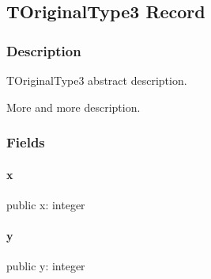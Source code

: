 \documentclass{report}
\begin{document}
\subsection*{TOriginalType3 Record}
\subsubsection*{\large{\textbf{Description}}\normalsize\hspace{1ex}\hfill}
TOriginalType3 abstract description.\hfill\vspace*{1ex}

 More and more description.\subsubsection*{\large{\textbf{Fields}}\normalsize\hspace{1ex}\hfill}
\paragraph*{x}\hspace*{\fill}

\begin{list}{}{
\setlength{\itemindent}{0cm}
\setlength{\listparindent}{0cm}
\setlength{\leftmargin}{\evensidemargin}
\addtolength{\leftmargin}{\tmplength}
\settowidth{\labelsep}{X}
\addtolength{\leftmargin}{\labelsep}
\setlength{\labelwidth}{\tmplength}
}
\begin{flushleft}
\item[\textbf{Declaration}\hfill]
\begin{ttfamily}
public x: integer \end{ttfamily}


\end{flushleft}
\end{list}
\paragraph*{y}\hspace*{\fill}

\begin{list}{}{
\setlength{\itemindent}{0cm}
\setlength{\listparindent}{0cm}
\setlength{\leftmargin}{\evensidemargin}
\addtolength{\leftmargin}{\tmplength}
\settowidth{\labelsep}{X}
\addtolength{\leftmargin}{\labelsep}
\setlength{\labelwidth}{\tmplength}
}
\begin{flushleft}
\item[\textbf{Declaration}\hfill]
\begin{ttfamily}
public y: integer \end{ttfamily}


\end{flushleft}
\end{list}
\end{document}
